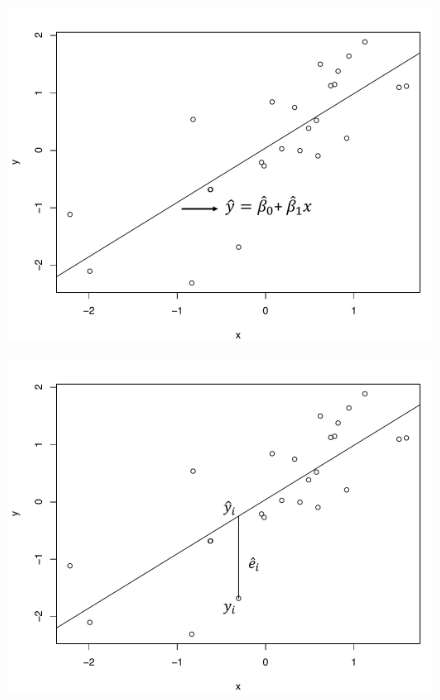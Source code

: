 \documentclass[10pt]{beamer}
\begin{document}
\begin{frame}
\begin{figure}
\includegraphics[scale=0.5]{figure/scatter2_2.pdf}
\end{figure}
\end{frame}

\begin{frame}
\begin{figure}
\includegraphics[scale=0.5]{figure/scatter3_2.pdf}
\end{figure}
\end{frame}
\end{document}
